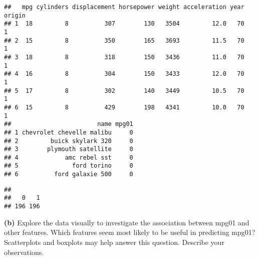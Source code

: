\documentclass[
]{article}
\newenvironment{Shaded}{\begin{snugshade}}{\end{snugshade}}
\newcommand{\FunctionTok}[1]{\textcolor[rgb]{0.13,0.29,0.53}{\textbf{#1}}}
\newcommand{\NormalTok}[1]{#1}
\newcommand{\SpecialCharTok}[1]{\textcolor[rgb]{0.81,0.36,0.00}{\textbf{#1}}}
\begin{document}
\begin{verbatim}
##   mpg cylinders displacement horsepower weight acceleration year origin
## 1  18         8          307        130   3504         12.0   70      1
## 2  15         8          350        165   3693         11.5   70      1
## 3  18         8          318        150   3436         11.0   70      1
## 4  16         8          304        150   3433         12.0   70      1
## 5  17         8          302        140   3449         10.5   70      1
## 6  15         8          429        198   4341         10.0   70      1
##                        name mpg01
## 1 chevrolet chevelle malibu     0
## 2         buick skylark 320     0
## 3        plymouth satellite     0
## 4             amc rebel sst     0
## 5               ford torino     0
## 6          ford galaxie 500     0
\end{verbatim}

\begin{Shaded}
\end{Shaded}

\begin{verbatim}
## 
##   0   1 
## 196 196
\end{verbatim}

\textbf{(b)} Explore the data visually to investigate the association
between mpg01 and other features. Which features seem most likely to be
useful in predicting mpg01? Scatterplots and boxplots may help answer
this question. Describe your observations.
\end{document}
